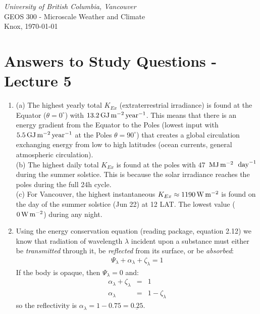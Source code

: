 \documentclass[11pt]{article}
\author{Andreas Christen}
\begin{document}
\begin{center}
\emph{University of British Columbia, Vancouver}\\
GEOS 300 - Microscale Weather and Climate\\
Knox, \today
\section*{Answers to Study Questions - Lecture 5}

\vspace{0.5cm}
\end{center}

\begin{enumerate}

\item (a) The highest yearly total $K_{Ex}$ (extraterrestrial irradiance) is found at the Equator ($\theta = 0^{\circ}$) with $13.2\,\rm{GJ}\,\rm{m}^{-2}\,\rm{year}^{-1}$. This means that there is an energy gradient from the Equator to the Poles (lowest input with $5.5\,\rm{GJ}\,\rm{m}^{-2}\,\rm{year}^{-1}$ at the Poles $\theta = 90^{\circ}$) that creates a global circulation exchanging energy from low to high latitudes (ocean currents, general atmospheric circulation).\\
(b) The highest daily total $K_{Ex}$ is found at the poles with $47$ $\,\rm{MJ}\,\rm{m}^{-2}\,$ $\rm{day}^{-1}$ during the summer solstice. This is because the solar irradiance reaches the poles during the full 24h cycle.\\
(c) For Vancouver, the highest instantaneous $K_{Ex} \approx 1190\,\rm{W}\,\rm{m}^{-2}$ is found on the day of the summer solstice (Jun 22) at 12 LAT. The lowest value ($0\,\rm{W}\,\rm{m}^{-2}$) during any night. \\

\item Using the energy conservation equation (reading package, equation 2.12) we know that radiation of wavelength $\lambda$ incident upon a substance must either be \emph{transmitted} through it, be \emph{reflected} from its surface, or be \emph{absorbed}: 
\begin{eqnarray}
\Psi_{\lambda} + \alpha_{\lambda} + \zeta_{\lambda} = 1
\label{E1}
\end{eqnarray}
If the body is opaque, then $\Psi_{\lambda} = 0$ and:
\begin{eqnarray}
\alpha_{\lambda} + \zeta_{\lambda} &=& 1 \nonumber \\
\alpha_{\lambda} &=& 1 - \zeta_{\lambda}
\end{eqnarray}
so the reflectivity is $\alpha_{\lambda} = 1 - 0.75 = \underline{0.25}$.


\end{enumerate}
\end{document}
